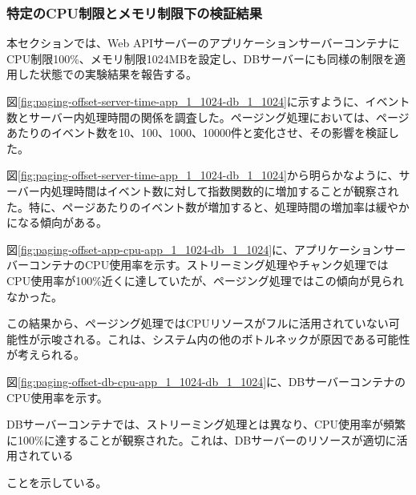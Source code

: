 \documentclass[../../../../main]{subfiles}
\begin{document}
    \subsubsection{特定のCPU制限とメモリ制限下の検証結果}\label{subsubsec:result-paging-offset-only-limit}

    本セクションでは、Web APIサーバーのアプリケーションサーバーコンテナにCPU制限100\%、メモリ制限1024MBを設定し、DBサーバーにも同様の制限を適用した状態での実験結果を報告する。

    \label{subsubsubsec:result-paging-offset-only-limit-server-time}

    図\ref{fig:paging-offset-server-time-app_1_1024-db_1_1024}に示すように、イベント数とサーバー内処理時間の関係を調査した。ページング処理においては、ページあたりのイベント数を10、100、1000、10000件と変化させ、その影響を検証した。

    

    図\ref{fig:paging-offset-server-time-app_1_1024-db_1_1024}から明らかなように、サーバー内処理時間はイベント数に対して指数関数的に増加することが観察された。特に、ページあたりのイベント数が増加すると、処理時間の増加率は緩やかになる傾向がある。

    \label{subsubsubsec:result-paging-offset-only-limit-cpu}

    図\ref{fig:paging-offset-app-cpu-app_1_1024-db_1_1024}に、アプリケーションサーバーコンテナのCPU使用率を示す。ストリーミング処理やチャンク処理ではCPU使用率が100\%近くに達していたが、ページング処理ではこの傾向が見られなかった。

    

    この結果から、ページング処理ではCPUリソースがフルに活用されていない可能性が示唆される。これは、システム内の他のボトルネックが原因である可能性が考えられる。

    図\ref{fig:paging-offset-db-cpu-app_1_1024-db_1_1024}に、DBサーバーコンテナのCPU使用率を示す。

    

    DBサーバーコンテナでは、ストリーミング処理とは異なり、CPU使用率が頻繁に100\%に達することが観察された。これは、DBサーバーのリソースが適切に活用されている

    ことを示している。

    \label{subsubsubsec:result-paging-offset-only-limit-mem}
\end{document}
